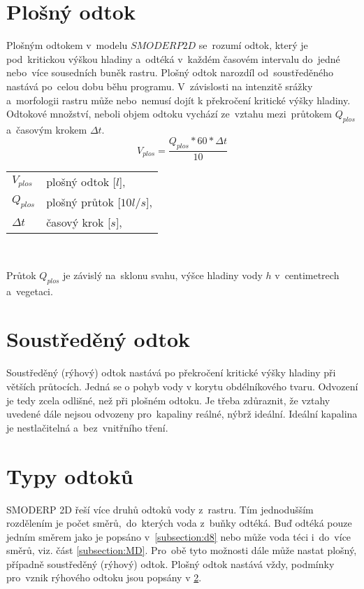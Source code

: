 \section{Plošný odtok} \label{subsection:plosnyodtok}
Plošným odtokem v~modelu $SMODERP 2D$ se~rozumí odtok, který je pod~kritickou výškou hladiny a~odtéká v~každém časovém intervalu do~jedné nebo~více sousedních buněk rastru. Plošný odtok narozdíl od~soustředěného nastává po~celou dobu běhu programu.
V~závislosti na intenzitě srážky a~morfologii rastru může nebo~nemusí dojít k překročení kritické výšky hladiny. Odtokové množství, neboli objem odtoku vychází ze~vztahu mezi~průtokem $Q_{plos}$ a~časovým krokem $\Delta t$.
\begin{equation}
V_{plos} = \frac{Q_{plos} * 60 * \Delta t}{10}
\end{equation}

\begin{tabular}{l l}
$V_{plos}$ & plošný odtok [$l$], \\
$Q_{plos}$ & plošný průtok [$10l/s$], \\
$\Delta t$ & časový krok [$s$], \\
\end{tabular} \\ \vspace{0.3cm}

Průtok $Q_{plos}$ je závislý na~sklonu svahu, výšce hladiny vody $h$ v~centimetrech a~vegetaci.


\section{Soustředěný odtok} \label{subsection:soustredenyodtok}
Soustředěný (rýhový) odtok nastává po překročení kritické výšky hladiny při větších průtocích. Jedná se o pohyb vody v korytu obdélníkového tvaru. Odvození je tedy zcela odlišné, než při plošném odtoku.
Je třeba zdůraznit, že vztahy uvedené dále nejsou odvozeny pro~kapaliny reálné, nýbrž ideální. Ideální kapalina je nestlačitelná a~bez~vnitřního tření.



\section{Typy odtoků}
SMODERP 2D řeší více druhů odtoků vody z~rastru. Tím jednodušším rozdělením je počet směrů,~do~kterých voda z~buňky odtéká. Buď odtéká pouze jedním směrem jako je popsáno v~\ref{subsection:d8}
nebo může voda téci i~do~více směrů, viz. část \ref{subsection:MD}. Pro~obě tyto možnosti dále může nastat plošný, případně soustředěný (rýhový) odtok. Plošný odtok nastává vždy, podmínky
pro~vznik rýhového odtoku jsou popsány v \ref{subsection:soustredenyodtok}.  
